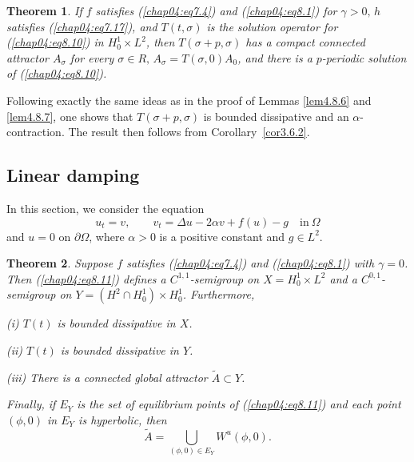 \documentclass{surv-l}
\theoremstyle{plain}
\newtheorem{theorem}{Theorem}[section]
\theoremstyle{definition}
\numberwithin{equation}{section}
\numberwithin{figure}{chapter}
\begin{document}
\begin{theorem}\label{thm4.8.9} If $f$ satisfies \emph{(\ref{chap04:eq7.4})} and \emph{(\ref{chap04:eq8.1})} for $\gamma>0,\, h$ satisfies \emph{(\ref{chap04:eq7.17})}, and $T(t, \sigma)$ is the solution operator for \emph{(\ref{chap04:eq8.10})} in $H_{0}^{1} \times L^{2}$, then $T(\sigma+p,\sigma)$ has a compact connected attractor $A_{\sigma}$ for every $\sigma\in R,\, A_{\sigma}=T(\sigma, 0)A_{0}$, and there is a $p$-periodic solution of \emph{(\ref{chap04:eq8.10})}.
\end{theorem}

Following exactly the same ideas as in the proof of Lemmas \ref{lem4.8.6} and \ref{lem4.8.7}, one shows that $T(\sigma+p, \sigma)$ is bounded dissipative and an $\alpha$-contraction. The result then follows from Corollary~\ref{cor3.6.2}.

\subsection{Linear damping}\label{subsec4.8.3} In this section, we consider the equation
\begin{equation}\label{chap04:eq8.11}
u_{t}=v,\quad\quad v_{t}=\Delta u-2\alpha v+f(u)-g\quad \mathrm{in}\ \Omega
\end{equation}
and $u =0$ on $\partial\Omega$, where $\alpha>0$ is a positive constant and $g\in L^{2}$.

\begin{theorem}\label{thm4.8.10} Suppose $f$ satisfies \emph{(\ref{chap04:eq7.4})} and \emph{(\ref{chap04:eq8.1})} with $\gamma=0$. Then \emph{(\ref{chap04:eq8.11})} defines a $C^{1,1}$-semigroup on $X=H_{0}^{1}\times L^{2}$ and a $C^{0,1}$-semigroup on $Y=(H^{2}\cap H_{0}^{1})\times H_{0}^{1}$. Furthermore,

\emph{(i)} $T(t)$ is bounded dissipative in $X$.

\emph{(ii)} $T(t)$ is bounded dissipative in $Y$.

\emph{(iii)} There is a connected global attractor $\tilde{A}\subset Y$.

\noindent Finally, if $E_{Y}$ is the set of equilibrium points of \emph{(\ref{chap04:eq8.11})} and each point $(\phi, 0)$ in $E_{Y}$ is hyperbolic, then
\begin{equation*}
\tilde{A}=\bigcup_{(\phi,0)\in E_{Y}}W^{u}(\phi, 0).
\end{equation*}
\end{theorem}
\end{document}
